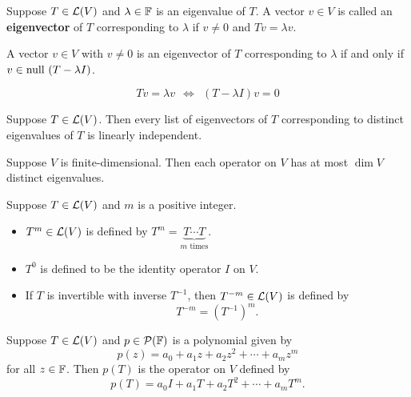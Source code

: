 \documentclass{extarticle}
\begin{document}
\begin{definition}[eigenvector]
    Suppose \(T \in \mathcal{L}(V)\) and \(\lambda \in \mathbb{F}\) is an eigenvalue of \(T\). A vector 
    \(v \in V\) is called an \textbf{eigenvector} of \(T\) corresponding to \(\lambda\)
    if \(v \neq 0\) and \(Tv = \lambda v\). 
\end{definition}

\begin{remark}
    A vector \(v \in V\) with \(v \neq 0\) is an eigenvector of \(T\) corresponding to \(\lambda\)
    if and only if \(v \in \text{null } (T - \lambda I)\). 

    \[Tv = \lambda v \ \ \Longleftrightarrow \ \ (T - \lambda I) v = 0\]
\end{remark}

\begin{lemma}
    Suppose \(T \in \mathcal{L}(V)\). Then every list of eigenvectors of \(T\) corresponding to 
    distinct eigenvalues of \(T\) is linearly independent.
\end{lemma}

\begin{thm}
    Suppose \(V\) is finite-dimensional. Then each operator on \(V\) has at most 
    \(\dim V\) distinct eigenvalues. 
\end{thm}

\begin{definition}[\(T^m\)]
    Suppose \(T \in \mathcal{L}(V)\) and \(m\) is a positive integer. 
    \begin{itemize}
        \item \(T^m \in \mathcal{L}(V)\) is defined by \(T^m = \underbrace{T\cdots T}_{m \text{ times}}\).
        \item \(T^0\) is defined to be the identity operator \(I\) on \(V\). 
        \item If \(T\) is invertible with inverse \(T^{-1}\), then \(T^{-m} \in \mathcal{L}(V)\) is defined by 
        \[T^{-m} = (T^{-1})^m.\]
    \end{itemize}
\end{definition}

\begin{definition}[\(p(T)\)]
    Suppose \(T \in \mathcal{L}(V)\) and \(p \in \mathcal{P}(\mathbb{F})\) is a polynomial given by 
    \[p(z) = a_0 + a_1 z + a_2 z^2 + \cdots + a_m z^m\]
    for all \(z \in \mathbb{F}\). Then \(p(T)\) is the operator on \(V\) defined by 
    \[p(T) = a_0I + a_1 T + a_2 T^2 + \cdots + a_m T^m.\]
\end{definition}
\end{document}
